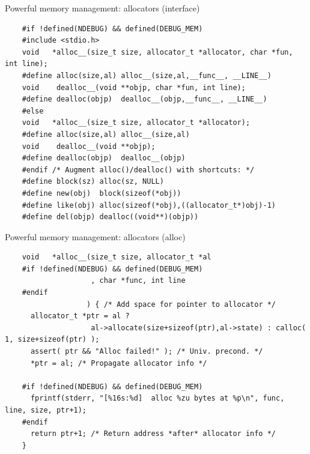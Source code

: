\begin{frame}[fragile]{Powerful memory management: allocators (interface)}

  \begin{lstlisting}
    #if !defined(NDEBUG) && defined(DEBUG_MEM)
    #include <stdio.h>
    void   *alloc__(size_t size, allocator_t *allocator, char *fun, int line);
    #define alloc(size,al) alloc__(size,al,__func__, __LINE__)
    void    dealloc__(void **objp, char *fun, int line);
    #define dealloc(objp)  dealloc__(objp,__func__, __LINE__)
    #else
    void   *alloc__(size_t size, allocator_t *allocator);
    #define alloc(size,al) alloc__(size,al)
    void    dealloc__(void **objp);
    #define dealloc(objp)  dealloc__(objp)
    #endif /* Augment alloc()/dealloc() with shortcuts: */    
    #define block(sz) alloc(sz, NULL)
    #define new(obj)  block(sizeof(*obj))
    #define like(obj) alloc(sizeof(*obj),((allocator_t*)obj)-1)
    #define del(objp) dealloc((void**)(objp))
  \end{lstlisting}
  
\end{frame}


\begin{frame}[fragile]{Powerful memory management: allocators (alloc)}

  \begin{lstlisting}
    void   *alloc__(size_t size, allocator_t *al
    #if !defined(NDEBUG) && defined(DEBUG_MEM)
                    , char *func, int line
    #endif
                   ) { /* Add space for pointer to allocator */
      allocator_t *ptr = al ?
                    al->allocate(size+sizeof(ptr),al->state) : calloc( 1, size+sizeof(ptr) );
      assert( ptr && "Alloc failed!" ); /* Univ. precond. */
      *ptr = al; /* Propagate allocator info */
    
    #if !defined(NDEBUG) && defined(DEBUG_MEM)
      fprintf(stderr, "[%16s:%d]  alloc %zu bytes at %p\n", func, line, size, ptr+1);
    #endif
      return ptr+1; /* Return address *after* allocator info */
    }
  \end{lstlisting}
  
\end{frame}


